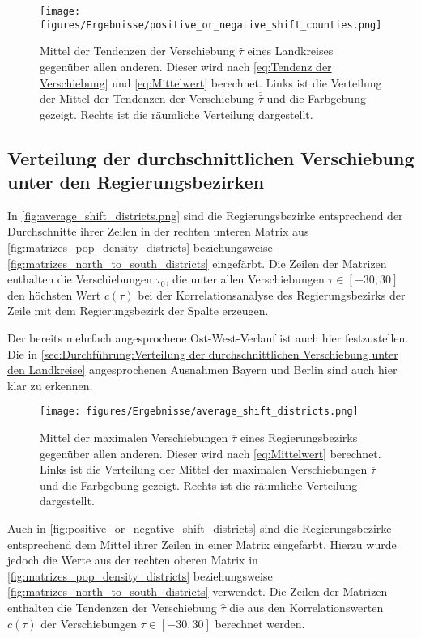 \begin{figure}[H]
    \centering
    \texttt{[image: figures/Ergebnisse/positive\_or\_negative\_shift\_counties.png]}
    \caption{
    Mittel der Tendenzen der Verschiebung $\overline{\hat{\tau}}$ eines Landkreises gegenüber allen anderen. Dieser wird nach \autoref{eq:Tendenz der Verschiebung} und \autoref{eq:Mittelwert} berechnet. Links ist die Verteilung der Mittel der Tendenzen der Verschiebung $\overline{\hat{\tau}}$ und die Farbgebung gezeigt. Rechts ist die räumliche Verteilung dargestellt.}
    \label{fig:positive_or_negative_shift_counties}
\end{figure}


\newpage
\subsection{Verteilung der durchschnittlichen Verschiebung unter den Regierungsbezirken}\label{sec:durchführung:Verteilung der durchschnittlichen Verschiebung unter den Regierungsbezirken}



In \autoref{fig:average_shift_districts.png} sind die Regierungsbezirke entsprechend der Durchschnitte ihrer Zeilen in der rechten unteren Matrix aus \autoref{fig:matrizes_pop_density_districts} beziehungsweise \autoref{fig:matrizes_north_to_south_districts} eingefärbt. Die Zeilen der Matrizen enthalten die Verschiebungen $\tau_0$, die unter allen Verschiebungen $\tau\in [-30,30]$ den höchsten Wert $c(\tau)$ bei der Korrelationsanalyse des Regierungsbezirks der Zeile mit dem Regierungsbezirk der Spalte erzeugen.

Der bereits mehrfach angesprochene Ost-West-Verlauf ist auch hier festzustellen. Die in \autoref{sec:Durchführung:Verteilung der durchschnittlichen Verschiebung unter den Landkreise} angesprochenen Ausnahmen Bayern und Berlin sind auch hier klar zu erkennen.

\begin{figure}[H]
    \centering
    \texttt{[image: figures/Ergebnisse/average\_shift\_districts.png]}
    \caption{Mittel der maximalen Verschiebungen $\overline{\tau}$ eines Regierungsbezirks gegenüber allen anderen. Dieser wird nach \autoref{eq:Mittelwert} berechnet. Links ist die Verteilung der Mittel der maximalen Verschiebungen $\overline{\tau}$ und die Farbgebung gezeigt. Rechts ist die räumliche Verteilung dargestellt.}
    \label{fig:average_shift_districts.png}
\end{figure}
\newpage
Auch in \autoref{fig:positive_or_negative_shift_districts} sind die Regierungsbezirke entsprechend dem Mittel ihrer Zeilen in einer Matrix eingefärbt. Hierzu wurde jedoch die Werte aus der rechten oberen Matrix in \autoref{fig:matrizes_pop_density_districts} beziehungsweise \autoref{fig:matrizes_north_to_south_districts} verwendet. Die Zeilen der Matrizen enthalten die Tendenzen der Verschiebung $\hat{\tau}$ die aus den Korrelationswerten $c(\tau)$ der Verschiebungen $\tau\in [-30,30]$ berechnet werden.

